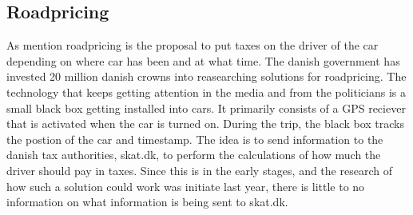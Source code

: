 \subsection{Roadpricing}
As mention roadpricing is the proposal to put taxes on the driver of the car depending on where car has been and at what time. The danish government has invested 20 million danish crowns into reasearching solutions for roadpricing. The technology that keeps getting attention in the media and from the politicians is a small black box getting installed into cars. It primarily consists of a GPS reciever that is activated when the car is turned on. During the trip, the black box tracks the postion of the car and timestamp. The idea is to send information to the danish tax authorities, skat.dk, to perform the calculations of how much the driver should pay in taxes. Since this is in the early stages, and the research of how such a solution could work was initiate last year, there is little to no information on what information is being sent to skat.dk. 